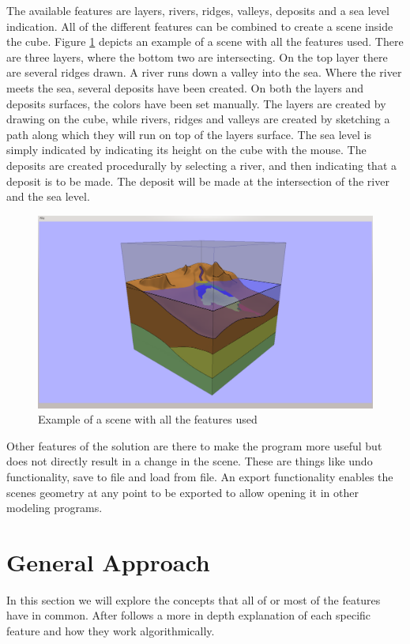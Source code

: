 \documentclass[a4paper,12pt]{report}
\begin{document}
The available features are layers, rivers, ridges, valleys, deposits and a sea level indication. All of the different features can be combined to create a scene inside the cube. Figure \ref{fig:allFeatures} depicts an example of a scene with all the features used. There are three layers, where the bottom two are intersecting. On the top layer there are several ridges drawn. A river runs down a valley into the sea. Where the river meets the sea, several deposits have been created. On both the layers and deposits surfaces, the colors have been set manually. The layers are created by drawing on the cube, while rivers, ridges and valleys are created by sketching a path along which they will run on top of the layers surface. The sea level is simply indicated by indicating its height on the cube with the mouse. The deposits are created procedurally by selecting a river, and then indicating that a deposit is to be made. The deposit will be made at the intersection of the river and the sea level.

\begin{figure}
 \includegraphics[trim = 50mm 5mm 50mm 7mm, clip,width=\linewidth]{thesis/results/allFeatures.png}
 \caption{Example of a scene with all the features used}
 \label{fig:allFeatures}
\end{figure}


Other features of the solution are there to make the program more useful but does not directly result in a change in the scene. These are things like undo functionality, save to file and load from file. An export functionality enables the scenes geometry at any point to be exported to allow opening it in other modeling programs.

\section{General Approach}
\label{subsec:generaldesign}
In this section we will explore the concepts that all of or most of the features have in common. After follows a more in depth explanation of each specific feature and how they work algorithmically.
\end{document}
